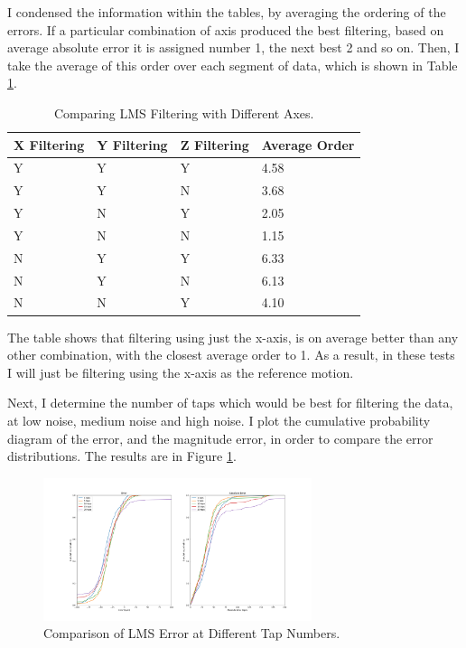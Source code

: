 \documentclass[12pt,a4paper,twoside,openright]{report}
\begin{document}
I condensed the information within the tables, by averaging the ordering of
the errors. If a particular combination of axis produced the best filtering,
based on average absolute error 
it is assigned number 1, the next best 2 and so on. Then, I take the average
of this order over each segment of data, which is shown in Table \ref{table:lms-errors}.

\begin{table}[]
\centering
\caption{Comparing LMS Filtering with Different Axes.}
\label{table:lms-errors}
\begin{tabular}{|l|l|l|l|}
\hline
X Filtering & Y Filtering & Z Filtering & Average Order \\ \hline
Y           & Y           & Y           & 4.58          \\
Y           & Y           & N           & 3.68          \\
Y           & N           & Y           & 2.05          \\
Y           & N           & N           & 1.15          \\
N           & Y           & Y           & 6.33          \\
N           & Y           & N           & 6.13          \\
N           & N           & Y           & 4.10          \\
\hline
\end{tabular}
\end{table}

The table shows that filtering using just the x-axis, is on average better
than any other combination, with the closest average order to 1. As a result,
in these tests I will just be filtering using the x-axis as the reference
motion.

Next, I determine the number of taps which would be best for filtering the
data, at low noise, medium noise and high noise. I plot the cumulative
probability diagram of the error, and the magnitude error, in order to compare
the error distributions. The results are in Figure \ref{fig:lms-medium}.

\begin{figure}[tbh]
	\centerline{\includegraphics[width=0.7\textwidth]{figs/lms-taps-error-medium-noise.png}}
	\caption{Comparison of LMS Error at Different Tap Numbers.}
	\label{fig:lms-medium}
\end{figure}
\end{document}
